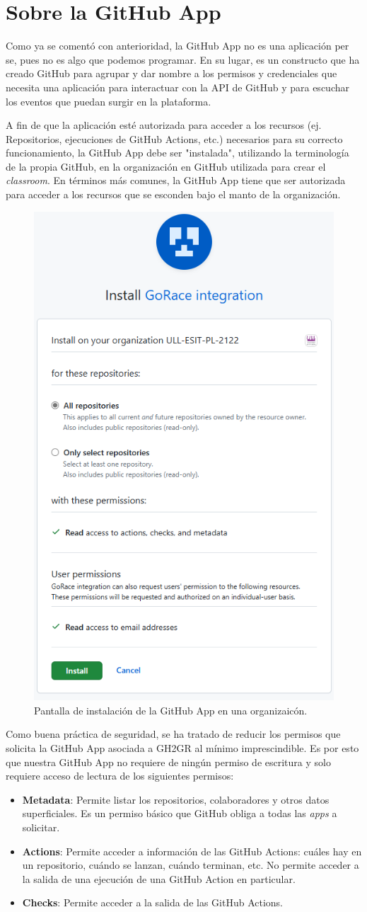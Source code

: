 \section{Sobre la GitHub App}
Como ya se comentó con anterioridad, la GitHub App no es una aplicación per se, pues no es algo que podemos programar. En su lugar, es un constructo que ha creado GitHub para agrupar y dar nombre a los permisos y credenciales que necesita una aplicación para interactuar con la API de GitHub y para escuchar los eventos que puedan surgir en la plataforma.

A fin de que la aplicación esté autorizada para acceder a los recursos (ej. Repositorios, ejecuciones de GitHub Actions, etc.) necesarios para su correcto funcionamiento, la GitHub App debe ser "instalada", utilizando la terminología de la propia GitHub, en la organización en GitHub utilizada para crear el \textit{classroom}. En términos más comunes, la GitHub App tiene que ser autorizada para acceder a los recursos que se esconden bajo el manto de la organización.

\begin{figure}
    \centering
    \includegraphics[width=0.4\linewidth]{images/install-screen.png}
    \caption{Pantalla de instalación de la GitHub App en una organizaicón.}
\end{figure}

Como buena práctica de seguridad, se ha tratado de reducir los permisos que solicita la GitHub App asociada a GH2GR al mínimo imprescindible. Es por esto que nuestra GitHub App no requiere de ningún permiso de escritura y solo requiere acceso de lectura de los siguientes permisos:
\begin{itemize}
    \item \textbf{Metadata}: Permite listar los repositorios, colaboradores y otros datos superficiales. Es un permiso básico que GitHub obliga a todas las \textit{apps} a solicitar.
    \item \textbf{Actions}: Permite acceder a información de las GitHub Actions: cuáles hay en un repositorio, cuándo se lanzan, cuándo terminan, etc. No permite acceder a la salida de una ejecución de una GitHub Action en particular.
    \item \textbf{Checks}: Permite acceder a la salida de las GitHub Actions.
\end{itemize}

